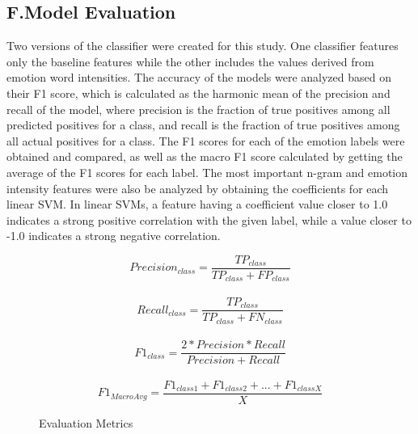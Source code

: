 \documentclass{icsthesis}
\begin{document}
\begin{mainmatter}
            \subsection{F.\hspace{0.5cm}Model Evaluation}
                
                Two versions of the classifier were created for this study. One classifier features only the baseline features while the other includes the values derived from emotion word intensities. The accuracy of the models were analyzed based on their F1 score, which is calculated as the harmonic mean of the precision and recall of the model, where precision is the fraction of true positives among all predicted positives for a class, and recall is the fraction of true positives among all actual positives for a class. The F1 scores for each of the emotion labels were obtained and compared, as well as the macro F1 score calculated by getting the average of the F1 scores for each label. The most important n-gram and emotion intensity features were also be analyzed by obtaining the coefficients for each linear SVM. In linear SVMs, a feature having a coefficient value closer to 1.0 indicates a strong positive correlation with the given label, while a value closer to -1.0 indicates a strong negative correlation.
                
                \begin{figure}[h!]
                    \centering
                    \begin{equation*}
                    {Precision_{class} = \frac{TP_{class}}{TP_{class}+FP_{class}}}
                    \end{equation*}\\
                    \vspace*{.05in}
                    \begin{equation*}
                    {Recall_{class} = \frac{TP_{class}}{TP_{class}+FN_{class}}}
                    \end{equation*}\\
                    \vspace*{.05in}
                    \begin{equation*}
                    {F1_{class} = \frac{2 * Precision * Recall}{Precision + Recall}}
                    \end{equation*}\\
                    \vspace*{.05in}
                    \begin{equation*}
                    {F1_{MacroAvg} = \frac{F1_{class1}+F1_{class2}+...+F1_{classX}}{X}}
                    \end{equation*}
                    \caption{Evaluation Metrics}
                \end{figure}   
		

\end{mainmatter}
\end{document}
